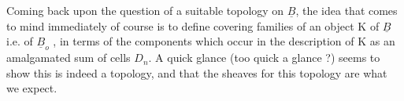 Coming back upon the question of a suitable topology on $\underline{B}$, the
idea that comes to mind immediately of course is to define covering
families of an object K of $\underline{B}$ i.e. of $\underline{B}_o$ , in terms of the components
which occur in the description of K as an  amalgamated sum of cells $D_n$.
A quick glance (too quick a glance ?) seems to show this is indeed a
topology, and that the sheaves for this topology are what we expect.

